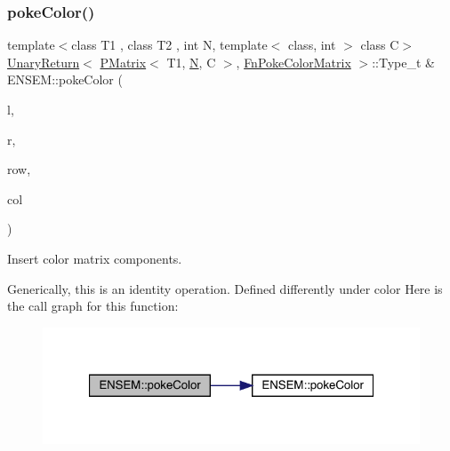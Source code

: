 \subsubsection{\texorpdfstring{pokeColor()}{pokeColor()}\hspace{0.1cm}{\footnotesize\ttfamily [2/2]}}
{\footnotesize\ttfamily template$<$class T1 , class T2 , int N, template$<$ class, int $>$ class C$>$ \\
\mbox{\hyperlink{structENSEM_1_1UnaryReturn}{Unary\+Return}}$<$ \mbox{\hyperlink{classENSEM_1_1PMatrix}{P\+Matrix}}$<$ T1, \mbox{\hyperlink{adat__devel_2lib_2hadron_2operator__name__util_8cc_a7722c8ecbb62d99aee7ce68b1752f337}{N}}, C $>$, \mbox{\hyperlink{structENSEM_1_1FnPokeColorMatrix}{Fn\+Poke\+Color\+Matrix}} $>$\+::Type\+\_\+t \& E\+N\+S\+E\+M\+::poke\+Color (\begin{DoxyParamCaption}\item[{\mbox{\hyperlink{classENSEM_1_1PMatrix}{P\+Matrix}}$<$ T1, \mbox{\hyperlink{adat__devel_2lib_2hadron_2operator__name__util_8cc_a7722c8ecbb62d99aee7ce68b1752f337}{N}}, C $>$ \&}]{l,  }\item[{const \mbox{\hyperlink{classENSEM_1_1PMatrix}{P\+Matrix}}$<$ T2, \mbox{\hyperlink{adat__devel_2lib_2hadron_2operator__name__util_8cc_a7722c8ecbb62d99aee7ce68b1752f337}{N}}, C $>$ \&}]{r,  }\item[{int}]{row,  }\item[{int}]{col }\end{DoxyParamCaption})\hspace{0.3cm}{\ttfamily [inline]}}



Insert color matrix components. 

Generically, this is an identity operation. Defined differently under color Here is the call graph for this function\+:\nopagebreak
\begin{figure}[H]
\begin{center}
\leavevmode
\includegraphics[width=321pt]{df/d0a/group__primmatrix_gab840db69dc60bcb095f46b69353d09f3_cgraph}
\end{center}
\end{figure}
\mbox{\label{group__primmatrix_ga738f0f1d3bad8770111452c72714a4ae}} 
